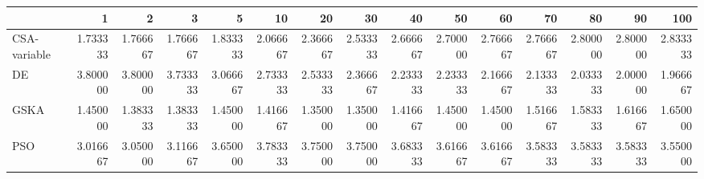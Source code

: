 \begin{tabular}{lrrrrrrrrrrrrrr}
\toprule
{} &       1   &       2   &       3   &       5   &       10  &       20  &       30  &       40  &       50  &       60  &       70  &       80  &       90  &       100 \\
\midrule
CSA-variable &  1.733333 &  1.766667 &  1.766667 &  1.833333 &  2.066667 &  2.366667 &  2.533333 &  2.666667 &  2.700000 &  2.766667 &  2.766667 &  2.800000 &  2.800000 &  2.833333 \\
DE           &  3.800000 &  3.800000 &  3.733333 &  3.066667 &  2.733333 &  2.533333 &  2.366667 &  2.233333 &  2.233333 &  2.166667 &  2.133333 &  2.033333 &  2.000000 &  1.966667 \\
GSKA         &  1.450000 &  1.383333 &  1.383333 &  1.450000 &  1.416667 &  1.350000 &  1.350000 &  1.416667 &  1.450000 &  1.450000 &  1.516667 &  1.583333 &  1.616667 &  1.650000 \\
PSO          &  3.016667 &  3.050000 &  3.116667 &  3.650000 &  3.783333 &  3.750000 &  3.750000 &  3.683333 &  3.616667 &  3.616667 &  3.583333 &  3.583333 &  3.583333 &  3.550000 \\
\bottomrule
\end{tabular}
